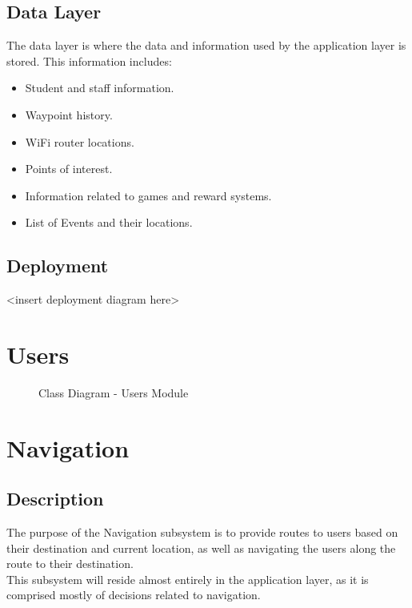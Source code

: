 \documentclass[english]{article}
\begin{document}
	    \subsection{Data Layer}
	        The data layer is where the data and information used by the application layer is stored. This information includes:
	        \begin{itemize}
	            \item Student and staff information.
	            \item Waypoint history.
	            \item WiFi router locations.
	            \item Points of interest.
	            \item Information related to games and reward systems.
	            \item List of Events and their locations.
	            
	        \end{itemize}
	        
	   \subsection{Deployment}
	        \textless insert deployment diagram here\textgreater
	
	\section{Users}
	    \begin{figure}[H]
            \centering	            \centerline{}
            \caption{Class Diagram - Users Module}
        \end{figure}
	
	\section{Navigation}	
        \subsection{Description}
            The purpose of the Navigation subsystem is to provide routes to users based on their destination and current location, as well as navigating the users along the route to their destination.\\
            This subsystem will reside almost entirely in the application layer, as it is comprised mostly of decisions related to navigation.
       
\end{document}
